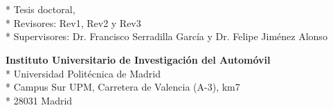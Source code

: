\cleardoublepage
\begin{fullwidth}
~\vfill
\thispagestyle{empty}
\setlength{\parindent}{0pt}
\setlength{\parskip}{\baselineskip}
\theauthor

\par{
	\textit{\thetitle}\\*
	Tesis doctoral, \thedate\\*
	Revisores: Rev1, Rev2 y Rev3\\*
	Supervisores: Dr. Francisco Serradilla García y Dr. Felipe Jiménez Alonso
	}

\par{
	\textbf{Instituto Universitario de Investigación del Automóvil}\\*
	Universidad Politécnica de Madrid\\*
	Campus Sur UPM, Carretera de Valencia (A-3), km7\\*
	28031 Madrid
}

\par{
	\doclicenseThis
}

\end{fullwidth}